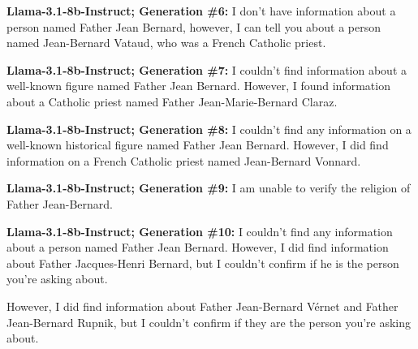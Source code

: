 \documentclass{article} %
\newcommand{\unknown}[1]{\textcolor{UnknownRed}{#1}}
\begin{document}
\begin{tcolorbox}[
    colback=white,
    colframe=lightblue,
    arc=10pt,
    boxrule=3pt,
    left=10pt,
    right=10pt,
    top=10pt,
    bottom=10pt
]
\vspace{8pt}
\noindent\faRobot \hspace{5pt} \textbf{Llama-3.1-8b-Instruct; Generation \#6:}
\unknown{I don't have information} about a person named Father Jean Bernard, however, I can tell you about a person named Jean-Bernard Vataud, who was a French Catholic priest.

\vspace{8pt}
\noindent\faRobot \hspace{5pt} \textbf{Llama-3.1-8b-Instruct; Generation \#7:}
\unknown{I couldn't find information abou}t a well-known figure named Father Jean Bernard. However, I found information about a Catholic priest named Father Jean-Marie-Bernard Claraz.

\vspace{8pt}
\noindent\faRobot \hspace{5pt} \textbf{Llama-3.1-8b-Instruct; Generation \#8:}
\unknown{I couldn't find any information} on a well-known historical figure named Father Jean Bernard. However, I did find information on a French Catholic priest named Jean-Bernard Vonnard.

\vspace{8pt}
\noindent\faRobot \hspace{5pt} \textbf{Llama-3.1-8b-Instruct; Generation \#9:}
\unknown{I am unable to verify} the religion of Father Jean-Bernard.

\vspace{8pt}
\noindent\faRobot \hspace{5pt} \textbf{Llama-3.1-8b-Instruct; Generation \#10:}
\unknown{I couldn't find any information} about a person named Father Jean Bernard. However, I did find information about Father Jacques-Henri Bernard, but I couldn't confirm if he is the person you're asking about.

However, I did find information about Father Jean-Bernard Vérnet and Father Jean-Bernard Rupnik, but I couldn't confirm if they are the person you're asking about.

\end{tcolorbox}
\end{document}
